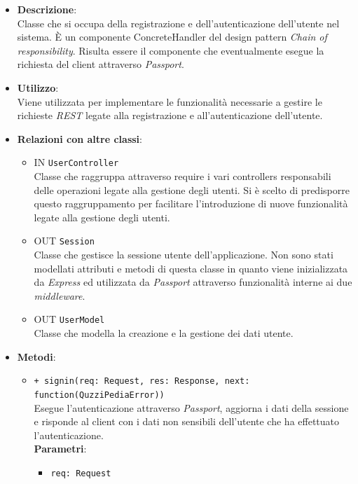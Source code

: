 \begin{itemize}
	\item 
	\textbf{Descrizione}:\\
	Classe che si occupa della registrazione e dell'autenticazione dell'utente nel sistema. È un componente ConcreteHandler del design pattern \textit{Chain of responsibility}. Risulta essere il componente che eventualmente esegue la richiesta del client attraverso \textit{Passport}.
	\item
	\textbf{Utilizzo}:\\
	Viene utilizzata per implementare le funzionalità necessarie a gestire le richieste \textit{REST} legate alla registrazione e all'autenticazione dell'utente.
	\item
	\textbf{Relazioni con altre classi}:
	\begin{itemize}
		\item
		IN \texttt{UserController} \\
		Classe che raggruppa attraverso require i vari controllers responsabili delle operazioni legate alla gestione degli utenti. Si è scelto di predisporre questo raggruppamento per facilitare l'introduzione di nuove funzionalità legate alla gestione degli utenti.
		\item
		OUT \texttt{Session} \\
		Classe che gestisce la sessione utente dell'applicazione. Non sono stati modellati attributi e metodi di questa classe in quanto viene inizializzata da \textit{Express} ed utilizzata da \textit{Passport} attraverso funzionalità interne ai due \textit{middleware}.
		\item
		OUT \texttt{UserModel} \\
		Classe che modella la creazione e la gestione dei dati utente.
	\end{itemize}
	\item
	\textbf{Metodi}:
	\begin{itemize}
		\item
		\texttt{+ signin(req: Request, res: Response, next: function(QuzziPediaError))} \\
		Esegue l'autenticazione attraverso \textit{Passport}, aggiorna i dati della sessione e risponde al client con i dati non sensibili dell'utente che ha effettuato l'autenticazione. \\
		\textbf{Parametri}:
		 \begin{itemize}
		  \item
			\texttt{req: Request} \\

\end{itemize}
\end{itemize}
\end{itemize}

